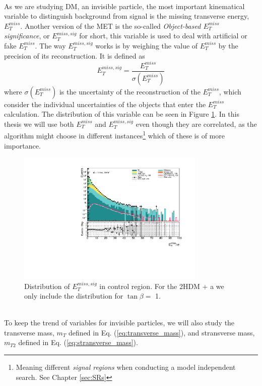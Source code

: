 \documentclass[12pt, a4paper]{book}
\begin{document}
\\As we are studying DM, an invisible particle, the most important kinematical variable to distinguish background from signal is the missing transverse energy, $E_T^{miss}$.
Another version of the MET is the so-called \textit{Object-based $E_T^{miss}$ significance}, or $E_T^{miss,sig}$ for short, this variable is used to deal with artificial or fake $E_T^{miss}$. The way $E_T^{miss,sig}$ works is by 
weighing the value of $E_T^{miss}$ by the precision of its reconstruction. It is defined as
\begin{equation}\label{eq:METsig}
    E_T^{miss,sig} = \frac{E_T^{miss}}{\sigma(E_T^{miss})}
\end{equation}
where $\sigma(E_T^{miss})$ is the uncertainty of the reconstruction of the $E_T^{miss}$, which consider the individual uncertainties of the objects that enter the $E_T^{miss}$ calculation. The distribution of this variable can be seen in Figure \ref{fig:met_sig_dist}. 
In this thesis we will use both $E_T^{miss}$ and $E_T^{miss,sig}$ even though they are correlated, as the algorithm might choose in different instances\footnote{Meaning different \textit{signal regions} when conducting a model independent search. See Chapter \ref{sec:SRs}} 
which of these is of more importance.\\
\begin{figure}[!ht]
    \centering
        \includegraphics[width=0.8\textwidth]{met_sig.pdf}
    \caption[Distribution of $E_{T}^{miss,sig}$ in control region]{Distribution of $E_{T}^{miss,sig}$ in control region.  For the 2HDM + a we only include the distribution for $\tan\beta=$ 1.}\label{fig:met_sig_dist}
\end{figure}
\\To keep the trend of variables for invisible particles, we will also study the transverse mass, $m_T$ defined in Eq. (\ref{eq:transverse_mass}), and stransverse mass, $m_{T2}$ defined in Eq. (\ref{eq:stransverse_mass}). 
\end{document}
